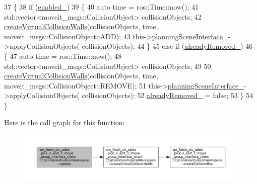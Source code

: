 \begin{DoxyCode}
37         \{
38             \textcolor{keywordflow}{if} (\hyperlink{classsm__fetch__six__table__pick__n__sort__1_1_1move__group__interface__client_1_1CpConstraintLateralWorkspace_a1ccb3b3c9fc3456aa3e4e95849ff7ded}{enabled\_})
39             \{
40                 \textcolor{keyword}{auto} time = ros::Time::now();
41                 std::vector<moveit\_msgs::CollisionObject> collisionObjects;
42                 \hyperlink{classsm__fetch__six__table__pick__n__sort__1_1_1move__group__interface__client_1_1CpConstraintLateralWorkspace_a19423677db3f855f172e4fe614f826a2}{createVirtualCollisionWalls}(collisionObjects, time, 
      moveit\_msgs::CollisionObject::ADD);
43                 this->\hyperlink{classsm__fetch__six__table__pick__n__sort__1_1_1move__group__interface__client_1_1CpConstraintLateralWorkspace_a58aa8daf72ad7b4363db32cf4dadec6c}{planningSceneInterface\_}->applyCollisionObjects(
      collisionObjects);
44             \}
45             \textcolor{keywordflow}{else} \textcolor{keywordflow}{if} (\hyperlink{classsm__fetch__six__table__pick__n__sort__1_1_1move__group__interface__client_1_1CpConstraintLateralWorkspace_ad4f581ba97f45a7215d7cbb994d34825}{alreadyRemoved\_})
46             \{
47                 \textcolor{keyword}{auto} time = ros::Time::now();
48                 std::vector<moveit\_msgs::CollisionObject> collisionObjects;
49 
50                 \hyperlink{classsm__fetch__six__table__pick__n__sort__1_1_1move__group__interface__client_1_1CpConstraintLateralWorkspace_a19423677db3f855f172e4fe614f826a2}{createVirtualCollisionWalls}(collisionObjects, time, 
      moveit\_msgs::CollisionObject::REMOVE);
51                 this->\hyperlink{classsm__fetch__six__table__pick__n__sort__1_1_1move__group__interface__client_1_1CpConstraintLateralWorkspace_a58aa8daf72ad7b4363db32cf4dadec6c}{planningSceneInterface\_}->applyCollisionObjects(
      collisionObjects);
52                 \hyperlink{classsm__fetch__six__table__pick__n__sort__1_1_1move__group__interface__client_1_1CpConstraintLateralWorkspace_ad4f581ba97f45a7215d7cbb994d34825}{alreadyRemoved\_} = \textcolor{keyword}{false};
53             \}
54         \}
\end{DoxyCode}
Here is the call graph for this function\+:
\nopagebreak
\begin{figure}[H]
\begin{center}
\leavevmode
\includegraphics[width=350pt]{classsm__fetch__six__table__pick__n__sort__1_1_1move__group__interface__client_1_1CpConstraintLateralWorkspace_a90a9740b4c6810933cb9f72e49c03a55_cgraph}
\end{center}
\end{figure}
